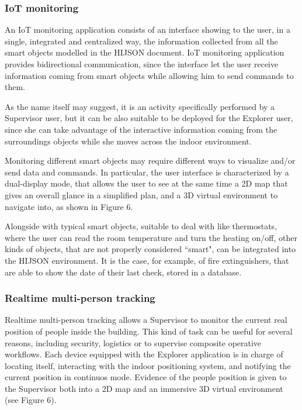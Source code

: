 \documentclass[]{egpubl}
\begin{document}
\subsubsection{IoT monitoring}

An IoT monitoring application consists of an interface showing to the user, in
a single, integrated and centralized way, the information collected from all
the smart objects modelled in the HIJSON document. IoT monitoring application
provides bidirectional communication, since the interface let the user receive
information coming from smart objects while allowing him to send commands to
them.

As the name itself may suggest, it is an activity specifically performed by a
Supervisor user, but it can be also suitable to be deployed for the Explorer
user, since she can take advantage of the interactive information coming from
the surroundings objects while she moves across the indoor environment.

Monitoring different smart objects may require different ways to visualize
and/or send data and commands. In particular, the user interface is
characterized by a dual-display mode, that allows the user to see at the same
time a 2D map that gives an overall glance in a simplified plan, and a 3D
virtual environment to navigate into, as shown in Figure 6.

Alongside with typical smart objects, suitable to deal with like thermostats,
where the user can read the room temperature and turn the heating on/off,
other kinds of objects, that are not properly considered ``smart", can be
integrated into the HIJSON environment. It is the case, for example, of fire
extinguishers, that are able to show the date of their last check, stored in a
database.

\subsubsection{Realtime multi-person tracking} Realtime multi-person tracking
allows a Supervisor to monitor the current real position of people inside the
building. This kind of task can be useful for several reasons, including
security, logistics or to supervise composite operative workflows. Each device
equipped with the Explorer application is in charge of locating itself,
interacting with the indoor positioning system, and notifying the current
position in continuos mode. Evidence of the people position is given to the
Supervisor both into a 2D map and an immersive 3D virtual environment (see
Figure 6).
\end{document}
